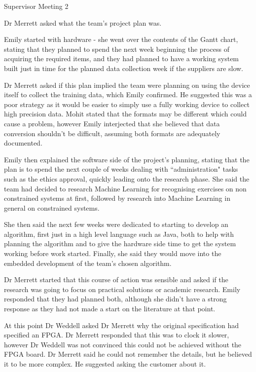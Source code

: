 \documentclass{article}
\begin{document}
\begin{Minutes}{Supervisor Meeting 2}

Dr Merrett asked what the team's project plan was.

Emily started with hardware - she went over the contents of the Gantt chart, stating that they
planned to spend the next week beginning the process of acquiring the required items, and they
had planned to have a working system built just in time for the planned data collection week
if the suppliers are slow.

Dr Merrett asked if this plan implied the team were planning on using the
device itself to collect the training data, which Emily confirmed. He suggested this was a
poor strategy as it would be easier to simply use a fully working device to collect high
precision data. Mohit stated that the formats may be different which could cause a problem,
however Emily interjected that she believed that data conversion shouldn't be difficult,
assuming both formats are adequately documented.

Emily then explained the software side of the project's planning, stating that the plan is
to spend the next couple of weeks dealing with ``administration" tasks such as the ethics
approval, quickly leading onto the research phase. She said the team had decided to research
Machine Learning for recognising exercises on non constrained systems at first, followed by
research into Machine Learning in general on constrained systems.

She then said the next few weeks were dedicated to starting to develop an algorithm, first
just in a high level language such as Java, both to help with planning the algorithm and to
give the hardware side time to get the system working before work started. Finally, she said
they would move into the embedded development of the team's chosen algorithm.

Dr Merrett started that this course of action was sensible and asked if the research was going
to focus on practical solutions or academic research. Emily responded that they had planned
both, although she didn't have a strong response as they had not made a start on the literature
at that point.

At this point Dr Weddell asked Dr Merrett why the original specification had specified an
FPGA. Dr Merrett responded that this was to clock it slower, however Dr Weddell was not
convinced this could not be achieved without the FPGA board. Dr Merrett said he could not
remember the details, but he believed it to be more complex. He suggested asking the customer
about it.


\end{Minutes}
\end{document}
